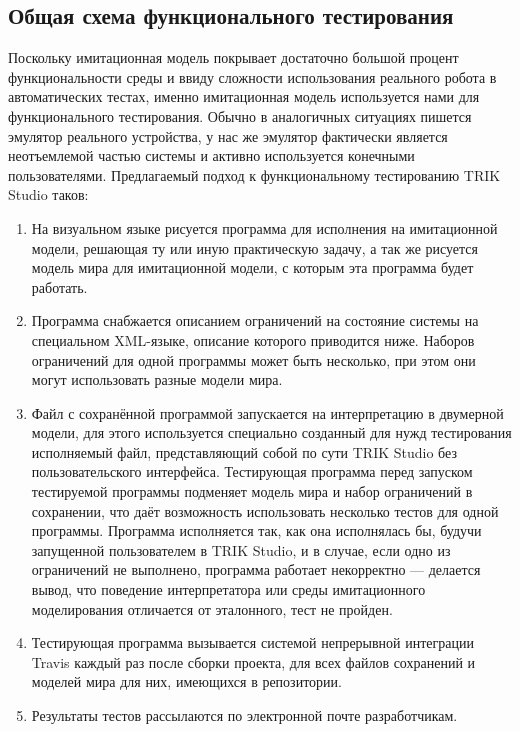 ﻿\documentclass[conference]{IEEEtran}
\begin{document}
\subsection{Общая схема функционального тестирования}
Поскольку имитационная модель покрывает достаточно большой процент функциональности 
среды и ввиду сложности использования реального робота в автоматических тестах, именно 
имитационная модель используется нами для функционального тестирования. Обычно в аналогичных 
ситуациях пишется эмулятор реального устройства, у нас же эмулятор фактически является 
неотъемлемой частью системы и активно используется конечными пользователями. Предлагаемый 
подход к функциональному тестированию TRIK Studio таков:
\begin{enumerate}
	\item На визуальном языке рисуется программа для исполнения на имитационной модели, 
			решающая ту или иную практическую задачу, а так же рисуется модель мира для 
			имитационной модели, с которым эта программа будет работать.
	\item Программа снабжается описанием ограничений на состояние системы на специальном 
			XML-языке, описание которого приводится ниже. Наборов ограничений для одной 
			программы может быть несколько, при этом они могут использовать разные модели мира.
	\item Файл с сохранённой программой запускается на интерпретацию в двумерной модели, 
			для этого используется специально созданный для нужд тестирования исполняемый 
			файл, представляющий собой по сути TRIK Studio без пользовательского интерфейса. 
			Тестирующая программа перед запуском тестируемой программы подменяет модель мира 
			и набор ограничений в сохранении, что даёт возможность использовать несколько 
			тестов для одной программы. Программа исполняется так, как она исполнялась бы, 
			будучи запущенной пользователем в TRIK Studio, и в случае, если одно из ограничений 
			не выполнено, программа работает некорректно --- делается вывод, что поведение 
			интерпретатора или среды имитационного моделирования отличается от эталонного, 
			тест не пройден.
	\item Тестирующая программа вызывается системой непрерывной интеграции Travis каждый 
			раз после сборки проекта, для всех файлов сохранений и моделей мира для них, 
			имеющихся в репозитории.
	\item Результаты тестов рассылаются по электронной почте разработчикам.
\end{enumerate}
\end{document}
